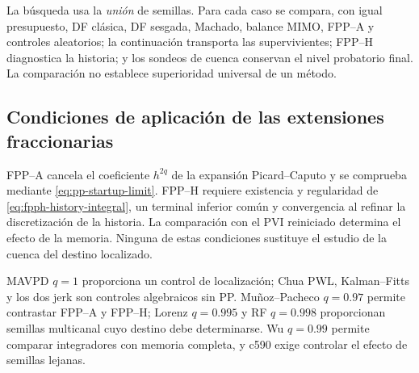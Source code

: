 La búsqueda usa la \emph{unión} de semillas. Para cada caso se
compara, con igual presupuesto, DF clásica, DF sesgada, Machado, balance MIMO,
FPP--A y controles aleatorios; la continuación transporta las supervivientes;
FPP--H diagnostica la historia; y los sondeos de cuenca conservan el nivel
probatorio final. La comparación no establece superioridad universal de un
método.

\subsection{Condiciones de aplicación de las extensiones fraccionarias}

FPP--A cancela el coeficiente \(h^{2q}\) de la expansión Picard--Caputo y
se comprueba mediante \cref{eq:pp-startup-limit}. FPP--H requiere existencia
y regularidad de \cref{eq:fpph-history-integral}, un terminal inferior común
y convergencia al refinar la discretización de la historia. La comparación
con el PVI reiniciado determina el efecto de la memoria. Ninguna de estas
condiciones sustituye el estudio de la cuenca del destino localizado.

MAVPD \(q=1\) proporciona un control de localización;
Chua PWL, Kalman--Fitts y los dos jerk son controles algebraicos sin PP. Muñoz--Pacheco
\(q=0.97\) permite contrastar FPP--A y FPP--H; Lorenz
\(q=0.995\) y RF \(q=0.998\) proporcionan semillas multicanal cuyo destino
debe determinarse. Wu \(q=0.99\) permite comparar integradores con memoria
completa, y c590 exige controlar el efecto de semillas lejanas.
